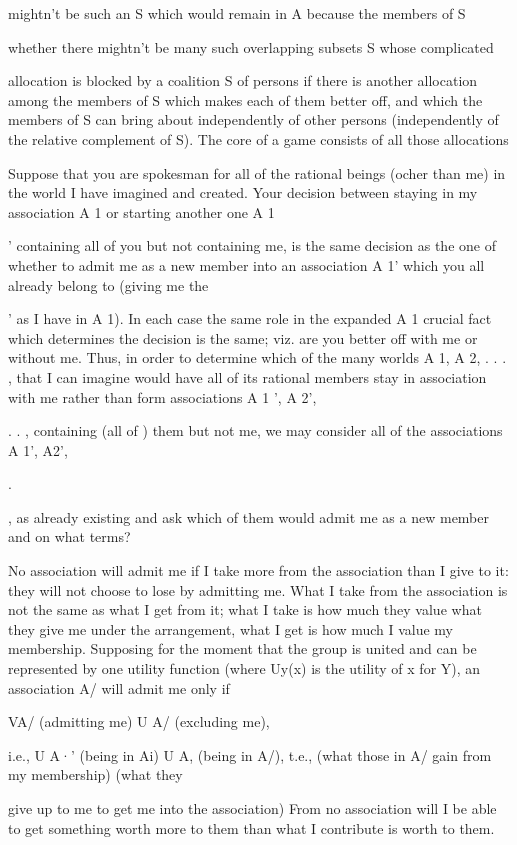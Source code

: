 \documentclass[11pt,openany]{book}
\begin{document}
mightn't be such an S which would remain in A because the members of S 

whether there mightn't be many such overlapping subsets S whose complicated 

allocation is blocked by a coalition S of persons if there is another allocation among the members of S which makes each of them better off, and which the members of S can bring about independently of other persons (independently of the relative complement of S). The core of a game consists of all those allocations 

Suppose that you are spokesman for all of the rational beings (ocher than me) in the world I have imagined and created. Your decision between staying in my association A 1 or starting another one A 1

' containing all of you but not containing me, is the same decision as the one of whether to admit me as a new member into an association A 1' which you all already belong to (giving me the 

' as I have in A 1). In each case the same role in the expanded A 1 crucial fact which determines the decision is the same; viz. are you better off with me or without me. Thus, in order to determine which of the many worlds A 1, A 2, . . . , that I can imagine would have all of its rational members stay in association with me rather than form associations A 1 ', A 2', 

. . , containing (all of ) them but not me, we may consider all of the associations A 1', A2', 

.

, as already existing and ask which of them would admit me as a new member and on what terms? 

No association will admit me if I take more from the association than I give to it: they will not choose to lose by admitting me. What I take from the association is not the same as what I get from it; what I take is how much they value what they give me under the arrangement, what I get is how much I value my membership. Supposing for the moment that the group is united and can be represented by one utility function (where Uy(x) is the utility of x for Y), an association A/ will admit me only if 

VA/ (admitting me)  U A/ (excluding me), 

i.e., U A·' (being in Ai)  U A, (being in A/), t.e., (what those in A/ gain from my membership)  (what they 

give up to me to get me into the association) From no association will I be able to get something worth more to them than what I contribute is worth to them. 
\end{document}
